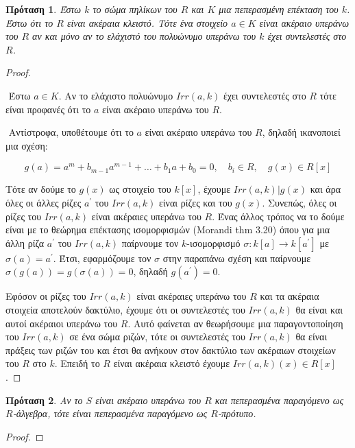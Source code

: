 \documentclass[oneside,a4paper]{article}
\newtheorem{prop}{Πρόταση}
\newcommand {\tl}{\textlatin}
\begin{document}
\begin{prop}
	Έστω $k$ το σώμα πηλίκων του $R$ και $K$ μια πεπερασμένη επέκταση του $k$. Έστω ότι το $R$ είναι ακέραια κλειστό. Τότε ένα στοιχείο $a \in K$ είναι ακέραιο υπεράνω του $R$ αν και μόνο αν το ελάχιστό του πολυώνυμο υπεράνω του $k$ έχει συντελεστές στο $R$.
\end{prop}


\begin{proof} $ $

	$ $\newline
	Έστω $a \in K$. Αν το ελάχιστο πολυώνυμο $Irr(a,k)$ έχει συντελεστές στο $R$ τότε είναι προφανές ότι το $a$ είναι ακέραιο υπεράνω του $R$.

	$ $\newline
	Αντίστροφα, υποθέτουμε ότι το $a$ είναι ακέραιο υπεράνω του $R$, δηλαδή ικανοποιεί μια σχέση:

	$$g(a) = a^m + b_{m-1} a^{m-1} + \ldots + b_1 a + b_0 = 0, \quad b_i \in R, \quad g(x) \in R[x]$$

	Τότε αν δούμε το $g(x)$ ως στοιχείο του $k[x]$, έχουμε $Irr(a,k) | g(x)$ και άρα όλες οι άλλες ρίζες $a^{\prime}$ του $Irr(a,k)$ είναι ρίζες και του $g(x)$. Συνεπώς, όλες οι ρίζες του $Irr(a,k)$ είναι ακέραιες υπεράνω του $R$. Ένας άλλος τρόπος να το δούμε είναι με το θεώρημα επέκτασης ισομορφισμών (\tl{Morandi  thm} 3.20) όπου για μια άλλη ρίζα $a^{\prime}$ του $Irr(a,k)$ παίρνουμε τον $k$-ισομορφισμό $\sigma: k[a] \rightarrow k[a^{\prime}]$ με $\sigma (a) = a^{\prime}$. Έτσι, εφαρμόζουμε τον $\sigma$ στην παραπάνω σχέση και παίρνουμε $\sigma(g(a)) = g(\sigma(a)) = 0$, δηλαδή $g(a^{\prime}) = 0$.

	Εφόσον οι ρίζες του $Irr(a,k)$ είναι ακέραιες υπεράνω του $R$ και τα ακέραια στοιχεία αποτελούν δακτύλιο, έχουμε ότι οι συντελεστές του $Irr(a,k)$ θα είναι και αυτοί ακέραιοι υπεράνω του $R$. Αυτό φαίνεται αν θεωρήσουμε μια παραγοντοποίηση του $Irr(a,k)$ σε ένα σώμα ριζών, τότε οι συντελεστές του $Irr(a,k)$ θα είναι πράξεις των ριζών του και έτσι θα ανήκουν στον δακτύλιο των ακέραιων στοιχείων του $R$ στο $k$. Επειδή το $R$ είναι ακέραια κλειστό έχουμε $Irr(a,k)(x) \in R[x]$.
\end{proof}

\begin{prop} Αν το $S$ είναι ακέραιο υπεράνω του $R$ και πεπερασμένα παραγόμενο ως $R$-άλγεβρα, τότε είναι πεπερασμένα παραγόμενο ως $R$-πρότυπο.
\end{prop}

\begin{proof}

\end{proof}
\end{document}

